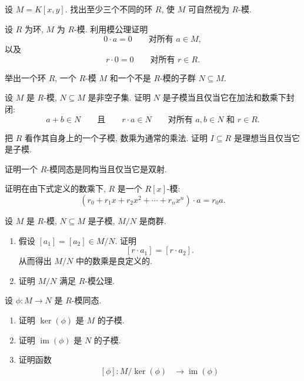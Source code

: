 \BookExerciseHeading
\begin{BookExercises}
  \item\label{ex:module-over-different-rings} 设 $M=K[x,y]$. 找出至少三个不同的环 $R$, 使 $M$ 可自然视为 $R$-模.
  \item\label{ex:zero-scalar-and-zero-vector} 设 $R$ 为环, $M$ 为 $R$-模. 利用模公理证明
    \[
      0\cdot a=0\qquad\text{对所有 }a\in M,
    \]
    以及
    \[
      r\cdot0=0\qquad\text{对所有 }r\in R.
    \]
  \item\label{ex:subgroup-not-submodule} 举出一个环 $R$, 一个 $R$-模 $M$ 和一个不是 $R$-模的子群 $N\subseteq M$.
  \item\label{ex:submodule-addition-and-scaling} 设 $M$ 是 $R$-模, $N\subseteq M$ 是非空子集. 证明 $N$ 是子模当且仅当它在加法和数乘下封闭:
    \[
      a+b\in N\qquad\text{且}\qquad r\cdot a\in N
      \qquad\text{对所有 }a,b\in N\text{ 和 }r\in R.
    \]
  \item\label{ex:ideal-as-submodule-of-ring} 把 $R$ 看作其自身上的一个子模, 数乘为通常的乘法. 证明 $I\subseteq R$ 是理想当且仅当它是子模.
  \item\label{ex:bijective-module-homomorphism-is-isomorphism} 证明一个 $R$-模同态是同构当且仅当它是双射.
  \item\label{ex:ring-module-via-polynomial-constant-term} 证明在由下式定义的数乘下, $R$ 是一个 $R[x]$-模:
    \[
      (r_{0}+r_{1}x+r_{2}x^{2}+\cdots+r_{n}x^{n})\cdot a=r_{0}a.
    \]
  \item\label{ex:quotient-module-is-well-defined} 设 $M$ 是 $R$-模, $N\subseteq M$ 是子模, $M/N$ 是商群.
    \begin{enumerate}[label=(\alph*)]
      \item 假设 $[a_{1}]=[a_{2}]\in M/N$. 证明
        \[
          [r\cdot a_{1}]=[r\cdot a_{2}].
        \]
        从而得出 $M/N$ 中的数乘是良定义的.
      \item 证明 $M/N$ 满足 $R$-模公理.
    \end{enumerate}
  \item\label{ex:first-isomorphism-theorem-for-modules} 设 $\phi:M\to N$ 是 $R$-模同态.
    \begin{enumerate}[label=(\alph*)]
      \item 证明 $\ker(\phi)$ 是 $M$ 的子模.
      \item 证明 $\operatorname{im}(\phi)$ 是 $N$ 的子模.
      \item 证明函数
        \[
          \begin{aligned}
            [\phi]:M/\ker(\phi)&\to\operatorname{im}(\phi)\\

\end{aligned}\]
\end{enumerate}
\end{BookExercises}
